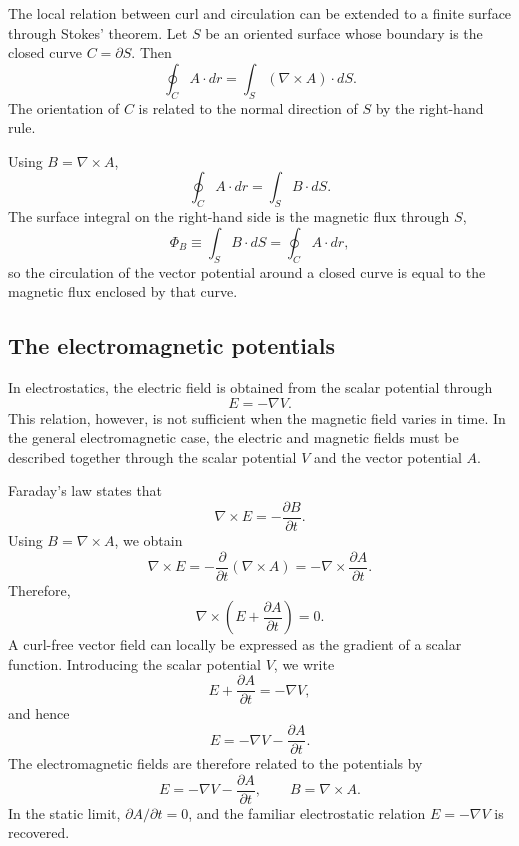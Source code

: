 The local relation between curl and circulation can be extended to a finite
surface through Stokes' theorem. Let \(S\) be an oriented surface whose
boundary is the closed curve \(C = \partial S\). Then
\[
	\oint_{C} A \cdot dr = \int_S (\nabla \times A) \cdot dS.
\]
The orientation of \(C\) is related to the normal direction of \(S\)
by the right-hand rule.

Using \(B = \nabla \times A\),
\[
	\oint_{C} A \cdot dr = \int_{S} B \cdot dS.
\]
The surface integral on the right-hand side is the magnetic flux
through \(S\),
\[
	\Phi_B \equiv \int_S B \cdot dS = \oint_C A \cdot dr,
\]
so the circulation of the vector potential around a closed curve is
equal to the magnetic flux enclosed by that curve.

\subsection{The electromagnetic potentials}

In electrostatics, the electric field is obtained from the scalar potential
through
\[
	E = - \nabla V.
\]
This relation, however, is not sufficient when the magnetic field varies in
time. In the general electromagnetic case, the electric and magnetic fields
must be described together through the scalar potential \(V\) and the vector
potential \(A\).

Faraday's law states that
\[
	\nabla \times E =
	- \frac{\partial B}{\partial t}.
\]
Using \(B = \nabla \times A\), we obtain
\[
	\nabla \times E = - \frac{\partial}{\partial t} (\nabla \times A) =
	- \nabla \times \frac{\partial A}{\partial t}.
\]
Therefore,
\[
	\nabla \times
	\left(
	E + \frac{\partial A}{\partial t}
	\right) = 0.
\]
A curl-free vector field can locally be expressed as the gradient of a
scalar function. Introducing the scalar potential \(V\), we write
\[
	E + \frac{\partial A}{\partial t} =
	- \nabla V,
\]
and hence
\[
	E = - \nabla V - \frac{\partial A}{\partial t}.
\]
The electromagnetic fields are therefore related to the potentials by
\[
	E = - \nabla V - \frac{\partial A}{\partial t}, \qquad
	B = \nabla \times A.
\]
In the static limit, \(\partial A/ \partial t = 0\), and the familiar
electrostatic relation \(E = - \nabla V\) is recovered.






